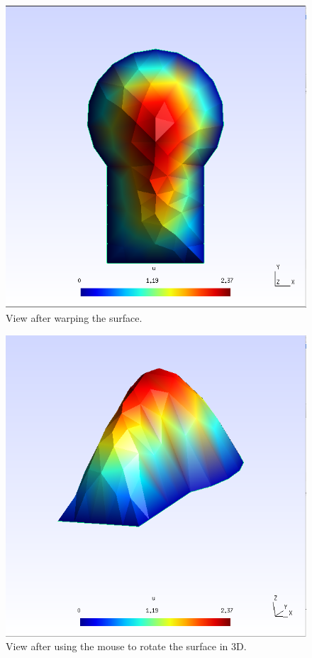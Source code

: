 \documentclass[a4paper,12pt]{article}
\begin{document}
\begin{figure}
\caption{View after warping the surface.}
\label{fig: warped surface}
\begin{center}
\includegraphics[scale=0.4]{images/warped_surface.png}
\end{center}
\end{figure}

\begin{figure}
\caption{View after using the mouse to rotate the surface in 3D.}
\label{fig: 3D view}
\begin{center}
\includegraphics[scale=0.4]{images/3Dview.png}
\end{center}
\end{figure}
\end{document}
